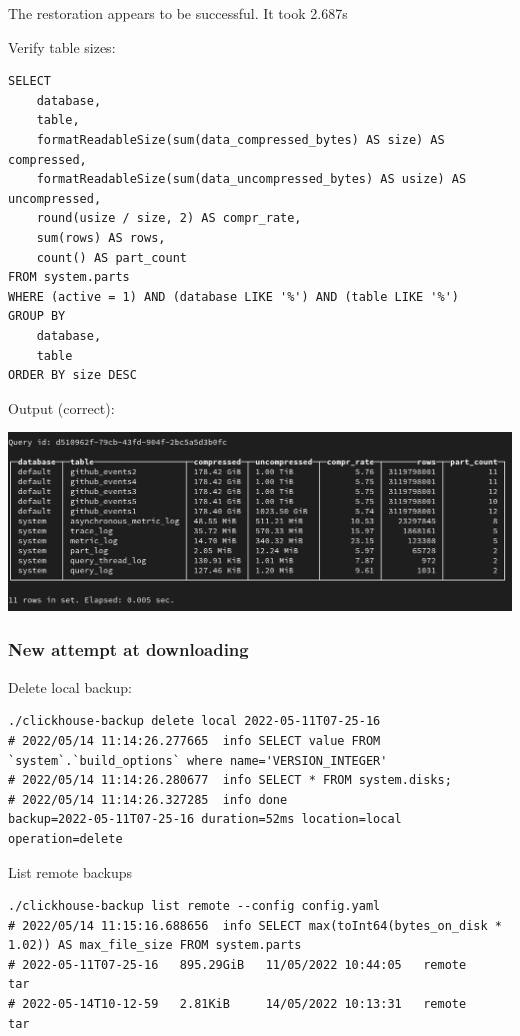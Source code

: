 The restoration appears to be successful.
It took 2.687s

Verify table sizes:
\begin{verbatim}
SELECT
    database,
    table,
    formatReadableSize(sum(data_compressed_bytes) AS size) AS compressed,
    formatReadableSize(sum(data_uncompressed_bytes) AS usize) AS uncompressed,
    round(usize / size, 2) AS compr_rate,
    sum(rows) AS rows,
    count() AS part_count
FROM system.parts
WHERE (active = 1) AND (database LIKE '%') AND (table LIKE '%')
GROUP BY
    database,
    table
ORDER BY size DESC
\end{verbatim}

Output (correct):
\begin{center}
\includegraphics[width=.9\linewidth]{figures/clickhouse/table_size_local_backup.png}
\end{center}
\subsubsection{New attempt at downloading}
\label{sec:orgee99b19}
Delete local backup:
\begin{verbatim}
./clickhouse-backup delete local 2022-05-11T07-25-16
# 2022/05/14 11:14:26.277665  info SELECT value FROM `system`.`build_options` where name='VERSION_INTEGER'
# 2022/05/14 11:14:26.280677  info SELECT * FROM system.disks;
# 2022/05/14 11:14:26.327285  info done                      backup=2022-05-11T07-25-16 duration=52ms location=local operation=delete
\end{verbatim}

List remote backups
\begin{verbatim}
./clickhouse-backup list remote --config config.yaml
# 2022/05/14 11:15:16.688656  info SELECT max(toInt64(bytes_on_disk * 1.02)) AS max_file_size FROM system.parts
# 2022-05-11T07-25-16   895.29GiB   11/05/2022 10:44:05   remote      tar
# 2022-05-14T10-12-59   2.81KiB     14/05/2022 10:13:31   remote      tar
\end{verbatim}

